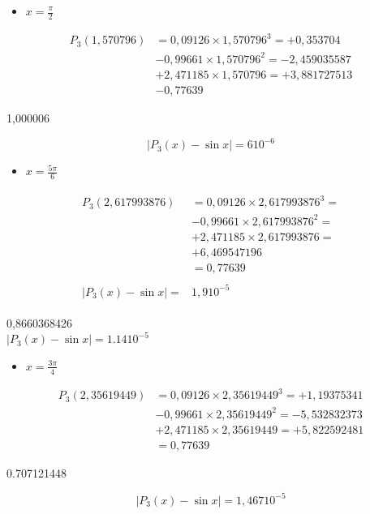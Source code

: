 \documentclass[10pt]{article}
\begin{document}
\begin{itemize}
  \item \(x=\frac{\pi}{2}\)
\end{itemize}

\[
\begin{aligned}
P_{3}(1,570796) & =0,09126 \times 1,570796^{3}=+0,353704 \\
& -0,99661 \times 1,570796^{2}=-2,459035587 \\
& +2,471185 \times 1,570796=+3,881727513 \\
& -0,77639
\end{aligned}
\]

1,000006

\[
\left|P_{3}(x)-\sin x\right|=610^{-6}
\]

\begin{itemize}
  \item \(x=\frac{5 \pi}{6}\)
\end{itemize}

\[
\begin{aligned}
\begin{aligned}
P_{3}(2,617993876) & =0,09126 \times 2,617993876^{3}= \\
& -0,99661 \times 2,617993876^{2}= \\
& +2,471185 \times 2,617993876= \\
& +6,469547196 \\
& =0,77639 \\
& \\
\left|P_{3}(x)-\sin x\right|= & 1,910^{-5}
\end{aligned}
\end{aligned}
\]

0,8660368426\\
\(\left|P_{3}(x)-\sin x\right|=1.1410^{-5}\)

\begin{itemize}
  \item \(x=\frac{3 \pi}{4}\)
\end{itemize}

\[
\begin{aligned}
P_{3}(2,35619449) & =0,09126 \times 2,35619449^{3}=+1,19375341 \\
& -0,99661 \times 2,35619449^{2}=-5,532832373 \\
& +2,471185 \times 2,35619449=+5,822592481 \\
& =0,77639
\end{aligned}
\]

0.707121448

\[
\left|P_{3}(x)-\sin x\right|=1,46710^{-5}
\]
\end{document}
